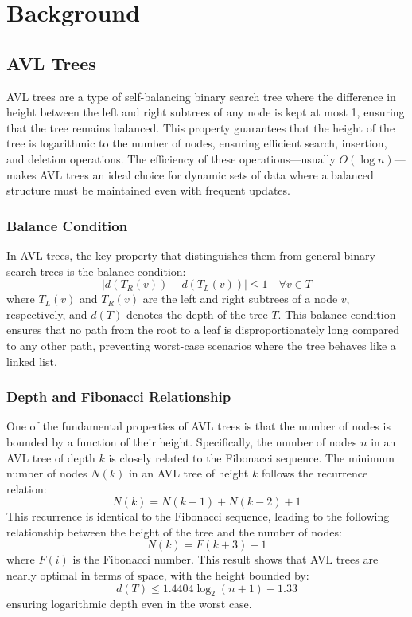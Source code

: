 \chapter{Background}\label{chap:background}

\section{AVL Trees}

AVL trees are a type of self-balancing binary search tree where the difference in height between the left and right subtrees of any node is kept at most 1, ensuring that the tree remains balanced. This property guarantees that the height of the tree is logarithmic to the number of nodes, ensuring efficient search, insertion, and deletion operations. The efficiency of these operations—usually $O(\log n)$—makes AVL trees an ideal choice for dynamic sets of data where a balanced structure must be maintained even with frequent updates.

\subsection{Balance Condition}
In AVL trees, the key property that distinguishes them from general binary search trees is the balance condition:
\[
|d(T_R(v)) - d(T_L(v))| \leq 1 \quad \forall v \in T
\]
where $T_L(v)$ and $T_R(v)$ are the left and right subtrees of a node $v$, respectively, and $d(T)$ denotes the depth of the tree $T$. This balance condition ensures that no path from the root to a leaf is disproportionately long compared to any other path, preventing worst-case scenarios where the tree behaves like a linked list.

\subsection{Depth and Fibonacci Relationship}
One of the fundamental properties of AVL trees is that the number of nodes is bounded by a function of their height. Specifically, the number of nodes $n$ in an AVL tree of depth $k$ is closely related to the Fibonacci sequence. The minimum number of nodes $N(k)$ in an AVL tree of height $k$ follows the recurrence relation:
\[
N(k) = N(k-1) + N(k-2) + 1
\]
This recurrence is identical to the Fibonacci sequence, leading to the following relationship between the height of the tree and the number of nodes:
\[
N(k) = F(k+3) - 1
\]
where $F(i)$ is the Fibonacci number. This result shows that AVL trees are nearly optimal in terms of space, with the height bounded by:
\[
d(T) \leq 1.4404 \log_2(n + 1) - 1.33
\]
ensuring logarithmic depth even in the worst case.



